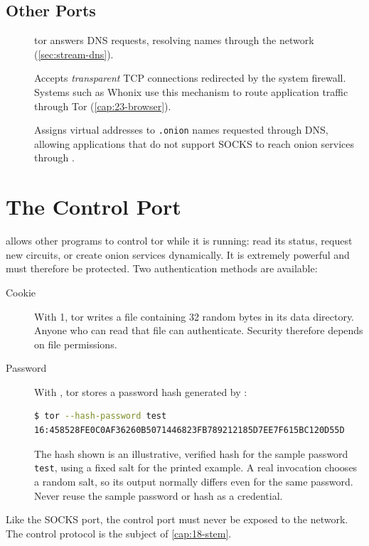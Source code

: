 \subsection{Other Ports}

\begin{description}
  \item[] tor answers DNS requests, resolving names through the network (\cref{sec:stream-dns}).
  \item[] Accepts \emph{transparent} TCP connections redirected by the system firewall. Systems such as Whonix use this mechanism to route application traffic through Tor (\cref{cap:23-browser}).
  \item[] Assigns virtual addresses to \texttt{.onion} names requested through DNS, allowing applications that do not support SOCKS to reach onion services through .
\end{description}

\section{The Control Port}\label{sec:torrc-controllo}

 allows other programs to control tor while it is running: read its status, request new circuits, or create onion services dynamically. It is extremely powerful and must therefore be protected. Two authentication methods are available:
\begin{description}
  \item[Cookie] With  1, tor writes a file containing 32 random bytes in its data directory. Anyone who can read that file can authenticate. Security therefore depends on file permissions.
  \item[Password] With , tor stores a password hash generated by :
\begin{lstlisting}[language=bash,numbers=none]
$ tor --hash-password test
16:458528FE0C0AF36260B5071446823FB789212185D7EE7F615BC120D55D
\end{lstlisting}
The hash shown is an illustrative, verified hash for the sample password \texttt{test}, using a fixed salt for the printed example. A real invocation chooses a random salt, so its output normally differs even for the same password. Never reuse the sample password or hash as a credential.
\end{description}
Like the SOCKS port, the control port must never be exposed to the network. The control protocol is the subject of \cref{cap:18-stem}.

